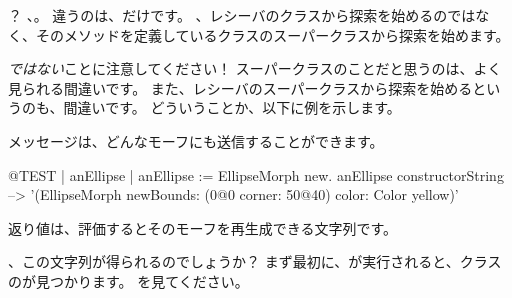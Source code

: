 \documentclass[a4paper,10pt,twoside]{book}
\begin{document}
？ 
、。
違うのは、だけです。
、レシーバのクラスから探索を始めるのではなく、そのメソッドを定義しているクラスのスーパークラスから探索を始めます。

\emph{ではない}ことに注意してください！
スーパークラスのことだと思うのは、よく見られる間違いです。
また、レシーバのスーパークラスから探索を始めるというのも、間違いです。
どういうことか、以下に例を示します。

メッセージは、どんなモーフにも送信することができます。
\begin{code}{@TEST | anEllipse | anEllipse := EllipseMorph new.}
anEllipse constructorString --> '(EllipseMorph newBounds: (0@0 corner: 50@40) color: Color yellow)'
\end{code}
返り値は、評価するとそのモーフを再生成できる文字列です。

、この文字列が得られるのでしょうか？
まず最初に、が実行されると、クラスのが見つかります。
を見てください。
\end{document}
